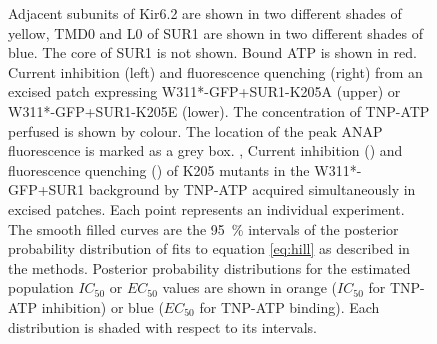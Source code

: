 \begin{figure}[h]
{	Adjacent subunits of Kir6.2 are shown in two different shades of yellow, TMD0 and L0 of SUR1 are shown in two different shades of blue.
	The core of SUR1 is not shown.
	Bound ATP is shown in red.
	 Current inhibition (left) and fluorescence quenching (right) from an excised patch expressing W311*-GFP+SUR1-K205A (upper) or W311*-GFP+SUR1-K205E (lower).
	The concentration of TNP-ATP perfused is shown by colour.
	The location of the peak ANAP fluorescence is marked as a grey box.
	,  Current inhibition () and fluorescence quenching () of K205 mutants in the W311*-GFP+SUR1 background by TNP-ATP acquired simultaneously in excised patches.
	Each point represents an individual experiment.
	The smooth filled curves are the \SI{95}{\percent} intervals of the posterior probability distribution of fits to equation \ref{eq:hill} as described in the methods.
	 Posterior probability distributions for the estimated population $IC_{50}$ or $EC_{50}$ values are shown in orange ($IC_{50}$ for TNP-ATP inhibition) or blue ($EC_{50}$ for TNP-ATP binding).
	Each distribution is shaded with respect to its intervals.
	}\label{ch6fig:k205_fig1}
\end{figure}

